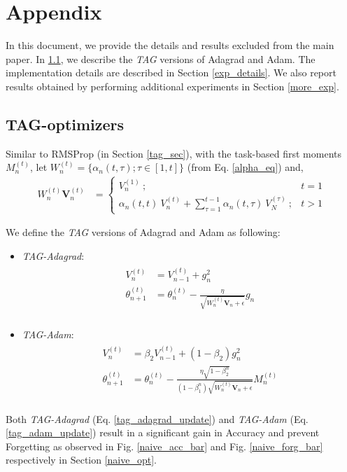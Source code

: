 \documentclass{article} \usepackage{collas2022_conference,times}
\begin{document}



\appendix
\section{Appendix}
In this document, we provide the details and results excluded from the main paper. In \ref{app_tag_opt}, we describe the \textit{TAG} versions of Adagrad and Adam. The implementation details are described in Section \ref{exp_details}. We also report results obtained by performing additional experiments in Section \ref{more_exp}. 

\subsection{TAG-optimizers}\label{app_tag_opt}
Similar to RMSProp (in Section \ref{tag_sec}), with the task-based first moments $M^{(t)}_n$, let $W^{(t)}_n=\{\alpha_n(t,\tau); \tau \in [1,t]\}$ (from Eq. \ref{alpha_eq}) and,
    \begin{align} \label{w_eq}
W^{(t)}_n \textbf{V}^{(t)}_n &= 
    \begin{cases} 
      V^{(1)}_n~; & t=1 \\
      \alpha_n(t,t)~ V^{(t)}_n + \sum\limits_{\tau=1}^{t-1} \alpha_n(t,\tau)~ V^{(\tau)}_N~; & t>1
      \end{cases}
    \end{align}

We define the \textit{TAG} versions of Adagrad and Adam as following: 
    \begin{itemize}
        \item \textit{TAG-Adagrad}:
    \begin{align} 
     \begin{split}
        V^{(t)}_n &= V^{(t)}_{n-1} + g^2_n\\
        \theta^{(t)}_{n+1} &= \theta^{(t)}_n - \frac{\eta}{\sqrt{W^{(t)}_n \textbf{V}_n + \epsilon}} g_n\\
        \end{split}\label{tag_adagrad_update}
    \end{align}
    \item \textit{TAG-Adam}:
     \begin{align} 
     \begin{split}
        V^{(t)}_n &= \beta_2 V^{(t)}_{n-1} + (1-\beta_2)g^2_n \\
        \theta^{(t)}_{n+1} &= \theta^{(t)}_n - \frac{\eta\sqrt{1-\beta_2^{n}}}{(1-\beta_1^{n})\sqrt{W^{(t)}_n \textbf{V}_n + \epsilon}}  M^{(t)}_n\\
        \end{split}\label{tag_adam_update}
    \end{align}
    \end{itemize}
Both \textit{TAG-Adagrad} (Eq. \ref{tag_adagrad_update}) and \textit{TAG-Adam} (Eq. \ref{tag_adam_update}) result in a significant gain in Accuracy and prevent Forgetting as observed in Fig. \ref{naive_acc_bar} and Fig. \ref{naive_forg_bar} respectively in Section \ref{naive_opt}.
\end{document}
